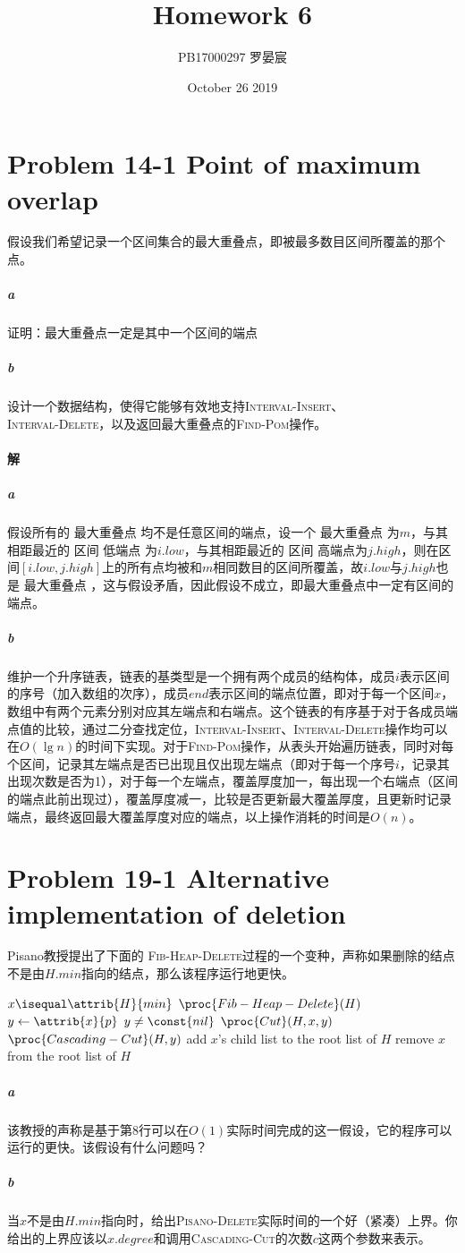 \documentclass{article}
\title{Homework 6}
\author{PB17000297 罗晏宸}
\date{October 26 2019}
\begin{document}
\maketitle

\section{Problem 14-1 Point of maximum overlap}
假设我们希望记录一个区间集合的最大重叠点，即被最多数目区间所覆盖的那个点。
\subparagraph*{a}
证明：最大重叠点一定是其中一个区间的端点
\subparagraph*{b}
设计一个数据结构，使得它能够有效地支持\textsc{Interval-Insert}、\\\textsc{Interval-Delete}，以及返回最大重叠点的\textsc{Find-Pom}操作。
\paragraph{解}
\subparagraph*{a}
假设所有的 最大重叠点 均不是任意区间的端点，设一个 最大重叠点 为$m$，与其相距最近的 区间 低端点 为$i.low$，与其相距最近的 区间 高端点为$j.high$，则在区间$[i.low, j.high]$上的所有点均被和$m$相同数目的区间所覆盖，故$i.low$与$j.high$也是 最大重叠点 ，这与假设矛盾，因此假设不成立，即最大重叠点中一定有区间的端点。
\subparagraph*{b}
维护一个升序链表，链表的基类型是一个拥有两个成员的结构体，成员$i$表示区间的序号（加入数组的次序），成员$end$表示区间的端点位置，即对于每一个区间$x$，数组中有两个元素分别对应其左端点和右端点。这个链表的有序基于对于各成员端点值的比较，通过二分查找定位，\textsc{Interval-Insert}、\textsc{Interval-Delete}操作均可以在$O(\lg{n})$的时间下实现。对于\textsc{Find-Pom}操作，从表头开始遍历链表，同时对每个区间，记录其左端点是否已出现且仅出现左端点（即对于每一个序号$i$，记录其出现次数是否为1），对于每一个左端点，覆盖厚度加一，每出现一个右端点（区间的端点此前出现过），覆盖厚度减一，比较是否更新最大覆盖厚度，且更新时记录端点，最终返回最大覆盖厚度对应的端点，以上操作消耗的时间是$O(n)$。

\section{Problem 19-1 Alternative implementation of deletion}
Pisano教授提出了下面的 \textsc{Fib-Heap-Delete}过程的一个变种，声称如果删除的结点不是由$H.min$指向的结点，那么该程序运行地更快。
\begin{codebox}
\li	\If $x \isequal \attrib{H}{min}$ \Then
\li		$\proc{Fib-Heap-Delete}(H)$
\li \Else
\li		$y \gets \attrib{x}{p}$
\li		\If $y \neq \const{nil}$ \Then
\li			$\proc{Cut}(H,x,y)$
\li			$\proc{Cascading-Cut}(H,y)$
		\End
\li		add $x$'s child list to the root list of $H$
\li		remove $x$ from the root list of $H$
	\End
\end{codebox}
\subparagraph*{a}
该教授的声称是基于第8行可以在$O(1)$实际时间完成的这一假设，它的程序可以运行的更快。该假设有什么问题吗？
\subparagraph*{b}
当$x$不是由$H.min$指向时，给出\textsc{Pisano-Delete}实际时间的一个好（紧凑）上界。你给出的上界应该以$x.degree$和调用\textsc{Cascading-Cut}的次数$c$这两个参数来表示。
\end{document}
